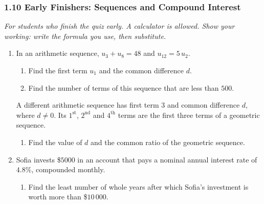 \documentclass[12pt, twoside]{article}
\begin{document}
\subsubsection*{1.10 Early Finishers: Sequences and Compound Interest}

\emph{For students who finish the quiz early. A calculator is allowed.
Show your working: write the formula you use, then substitute.}

\begin{enumerate}[itemsep=0.15cm]

\item[1.]

In an arithmetic sequence, $u_{3} + u_{8} = 48$ and $u_{12} = 5\,u_{2}$.

\begin{enumerate}[itemsep=0.1cm]
  \item Find the first term $u_{1}$ and the common difference $d$.
  \vfill
  \item Find the number of terms of this sequence that are less than
  $500$.
  \vfill
\end{enumerate}

A different arithmetic sequence has first term $3$ and common difference
$d$, where $d \neq 0$. Its $1^{\text{st}}$, $2^{\text{nd}}$ and
$4^{\text{th}}$ terms are the first three terms of a geometric sequence.

\begin{enumerate}[resume, itemsep=0.1cm]
  \item Find the value of $d$ and the common ratio of the geometric
  sequence.
\end{enumerate}

\vfill

\newpage

\item[2.]

Sofia invests \$$5000$ in an account that pays a nominal annual interest
rate of $4.8\%$, compounded monthly.

\begin{enumerate}[itemsep=0.1cm]
  \item Find the least number of whole years after which Sofia's
  investment is worth more than \$$10\,000$.
  \vfill
\end{enumerate}


\end{enumerate}
\end{document}
